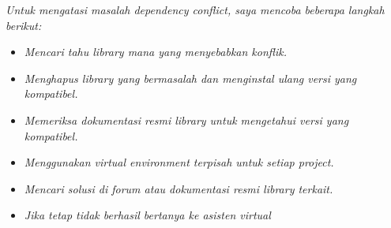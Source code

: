 \documentclass[11pt,a4paper]{article}
\begin{document}
\begin{enumerate}
    \textit{Untuk mengatasi masalah dependency conflict, saya mencoba beberapa langkah berikut:}
    \begin{itemize}
        \item \textit{Mencari tahu library mana yang menyebabkan konflik.}
        \item \textit{Menghapus library yang bermasalah dan menginstal ulang versi yang kompatibel.}
        \item \textit{Memeriksa dokumentasi resmi library untuk mengetahui versi yang kompatibel.}
        \item \textit{Menggunakan virtual environment terpisah untuk setiap project.}
        \item \textit{Mencari solusi di forum atau dokumentasi resmi library terkait.}
        \item \textit{Jika tetap tidak berhasil bertanya ke asisten virtual}
    \end{itemize}
    

\end{enumerate}
\end{document}
